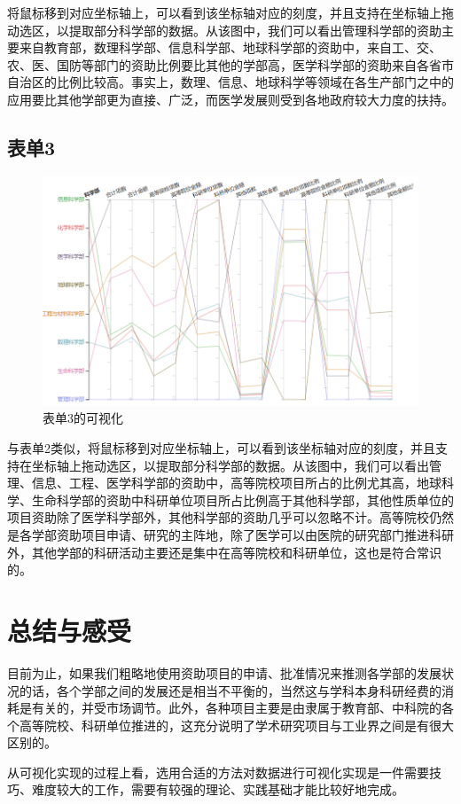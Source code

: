 \documentclass[a4paper,11pt,UTF8]{ctexart}
\begin{document}
将鼠标移到对应坐标轴上，可以看到该坐标轴对应的刻度，并且支持在坐标轴上拖动选区，以提取部分科学部的数据。从该图中，我们可以看出管理科学部的资助主要来自教育部，数理科学部、信息科学部、地球科学部的资助中，来自工、交、农、医、国防等部门的资助比例要比其他的学部高，医学科学部的资助来自各省市自治区的比例比较高。事实上，数理、信息、地球科学等领域在各生产部门之中的应用要比其他学部更为直接、广泛，而医学发展则受到各地政府较大力度的扶持。

\subsection{表单3}

\begin{figure}[h]
\centering
\includegraphics[scale=0.35]{QQ20191028162805.png}
\caption{表单3的可视化}
\end{figure}

与表单2类似，将鼠标移到对应坐标轴上，可以看到该坐标轴对应的刻度，并且支持在坐标轴上拖动选区，以提取部分科学部的数据。从该图中，我们可以看出管理、信息、工程、医学科学部的资助中，高等院校项目所占的比例尤其高，地球科学、生命科学部的资助中科研单位项目所占比例高于其他科学部，其他性质单位的项目资助除了医学科学部外，其他科学部的资助几乎可以忽略不计。高等院校仍然是各学部资助项目申请、研究的主阵地，除了医学可以由医院的研究部门推进科研外，其他学部的科研活动主要还是集中在高等院校和科研单位，这也是符合常识的。

\section{总结与感受}

目前为止，如果我们粗略地使用资助项目的申请、批准情况来推测各学部的发展状况的话，各个学部之间的发展还是相当不平衡的，当然这与学科本身科研经费的消耗是有关的，并受市场调节。此外，各种项目主要是由隶属于教育部、中科院的各个高等院校、科研单位推进的，这充分说明了学术研究项目与工业界之间是有很大区别的。

从可视化实现的过程上看，选用合适的方法对数据进行可视化实现是一件需要技巧、难度较大的工作，需要有较强的理论、实践基础才能比较好地完成。
\end{document}
